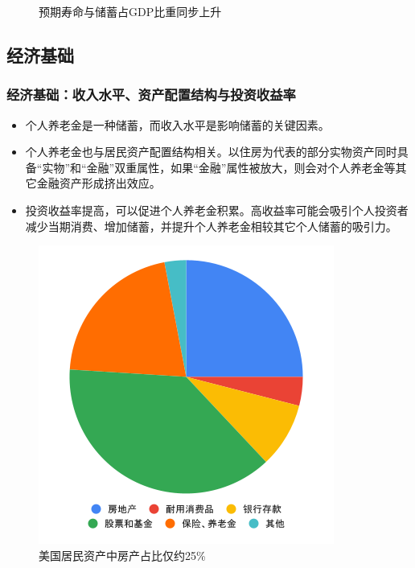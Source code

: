 \documentclass[a4paper,zihao=5]{ctexbeamer}
\begin{document}
\begin{frame}
\begin{figure}[H]
\begin{minipage}{0.48\linewidth}
            \caption{预期寿命与储蓄占GDP比重同步上升}
        \end{minipage}
    \end{figure}

\end{frame}

\subsection{经济基础}

\begin{frame}
    \frametitle{经济基础：收入水平、资产配置结构与投资收益率}
    \begin{itemize}
        \item 个人养老金是一种储蓄，而收入水平是影响储蓄的关键因素。
        \item 个人养老金也与居民资产配置结构相关。以住房为代表的部分实物资产同时具备“实物”和“金融”双重属性，如果“金融”属性被放大，则会对个人养老金等其它金融资产形成挤出效应。
        \item 投资收益率提高，可以促进个人养老金积累。高收益率可能会吸引个人投资者减少当期消费、增加储蓄，并提升个人养老金相较其它个人储蓄的吸引力。
    \end{itemize}
    \begin{figure}[H]
        \centering
        \begin{minipage}{0.48\linewidth}
            \centering
            \includegraphics[width=0.75\linewidth]{img/us.png}
            \caption{美国居民资产中房产占比仅约25\%}
        \end{minipage}
        \begin{minipage}{0.48\linewidth}

\end{minipage}
\end{figure}
\end{frame}
\end{document}

